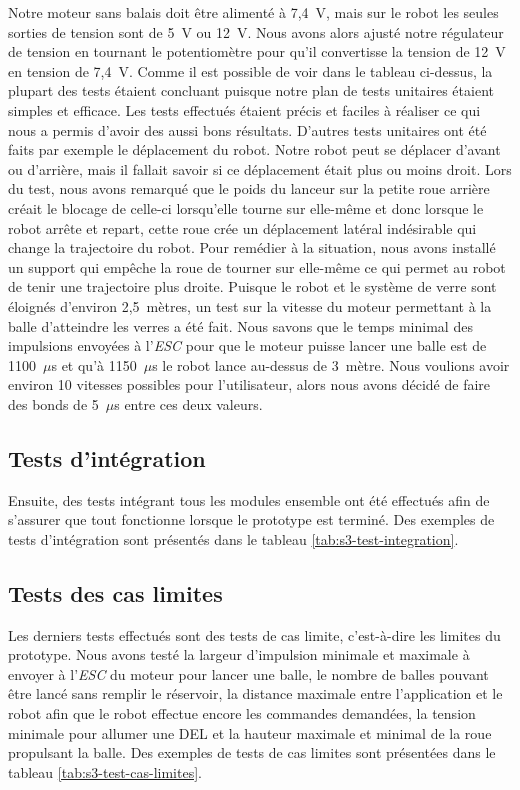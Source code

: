 Notre moteur sans balais doit être alimenté à 7,4~V, mais sur le robot les seules sorties de tension sont de 5~V ou 12~V.
Nous avons alors ajusté notre régulateur de tension en tournant le potentiomètre pour qu’il convertisse la tension de 12~V en tension de 7,4~V.
Comme il est possible de voir dans le tableau ci-dessus, la plupart des tests étaient concluant puisque notre plan de tests unitaires étaient simples et efficace.
Les tests effectués étaient précis et faciles à réaliser ce qui nous a permis d’avoir des aussi bons résultats.
D'autres tests unitaires ont été faits par exemple le déplacement du robot.
Notre robot peut se déplacer d’avant ou d’arrière, mais il fallait savoir si ce déplacement était plus ou moins droit.
Lors du test, nous avons remarqué que le poids du lanceur sur la petite roue arrière créait le blocage de celle-ci lorsqu’elle tourne sur elle-même et donc lorsque le robot arrête et repart, cette roue crée un déplacement latéral indésirable qui change la trajectoire du robot.
Pour remédier à la situation, nous avons installé un support qui empêche la roue de tourner sur elle-même ce qui permet au robot de tenir une trajectoire plus droite.
Puisque le robot et le système de verre sont éloignés d’environ 2,5~mètres, un test sur la vitesse du moteur permettant à la balle d’atteindre les verres a été fait.
Nous savons que le temps minimal des impulsions envoyées à l'\emph{ESC} pour que le moteur puisse lancer une balle est de 1100~$\mu$s et qu’à 1150~$\mu$s le robot lance au-dessus de 3~mètre.
Nous voulions avoir environ 10 vitesses possibles pour l’utilisateur, alors nous avons décidé de faire des bonds de 5~$\mu$s entre ces deux valeurs.

\subsection{Tests d'intégration}

Ensuite, des tests intégrant tous les modules ensemble ont été effectués afin de s’assurer que tout fonctionne lorsque le prototype est terminé.
Des exemples de tests d'intégration sont présentés dans le tableau \ref{tab:s3-test-integration}.

\subsection{Tests des cas limites}

Les derniers tests effectués sont des tests de cas limite, c’est-à-dire les limites du prototype.
Nous avons testé la largeur d’impulsion minimale et maximale à envoyer à l'\emph{ESC} du moteur pour lancer une balle, le nombre de balles pouvant être lancé sans remplir le réservoir, la distance maximale entre l’application et le robot afin que le robot effectue encore les commandes demandées, la tension minimale pour allumer une DEL et la hauteur maximale et minimal de la roue propulsant la balle.
Des exemples de tests de cas limites sont présentées dans le tableau \ref{tab:s3-test-cas-limites}.


